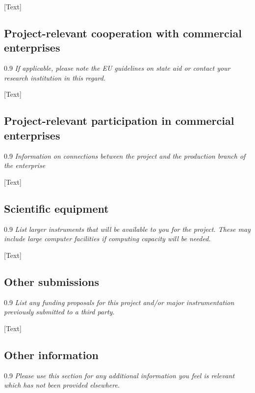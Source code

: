 \documentclass[a4paper,11pt]{article}
\newenvironment{comment}{\begin{spacing}{0.9}\footnotesize\it}{\end{spacing}}
\begin{document}
[Text]

\subsection{Project-relevant cooperation with commercial enterprises}
\begin{comment}
  If applicable, please note the EU guidelines on state aid or contact your research institution in this regard.
\end{comment}

[Text]


\subsection{Project-relevant participation in commercial enterprises}
\begin{comment}
  Information on connections between the project and the production branch of the enterprise
\end{comment}

[Text]

\subsection{Scientific equipment}
\begin{comment}
  List larger instruments that will be available to you for the project. These may include large computer facilities if computing capacity will be needed.
\end{comment}

[Text]

\subsection{Other submissions}
\begin{comment}
  List any funding proposals for this project and/or major instrumentation previously submitted to a third party.
\end{comment}

[Text]

\subsection{Other information}
\begin{comment}
  Please use this section for any additional information you feel is relevant which has not been provided elsewhere.
\end{comment}
\end{document}
